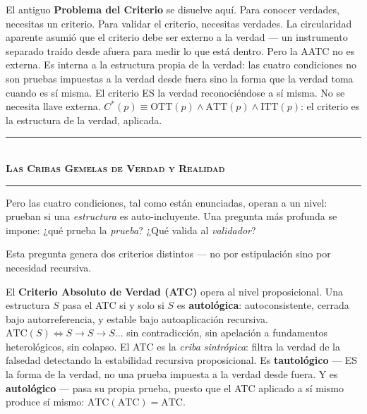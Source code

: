 \documentclass[10pt, openany, oneside]{book}
\renewcommand{\normalsize}{\fontsize{10}{13}\selectfont}
\begin{document}
El antiguo \textbf{Problema del Criterio} se disuelve aquí. Para conocer verdades, necesitas un criterio. Para validar el criterio, necesitas verdades. La circularidad aparente asumió que el criterio debe ser externo a la verdad --- un instrumento separado traído desde afuera para medir lo que está dentro. Pero la AATC no es externa. Es interna a la estructura propia de la verdad: las cuatro condiciones no son pruebas impuestas a la verdad desde fuera sino la forma que la verdad toma cuando es sí misma. El criterio ES la verdad reconociéndose a sí misma. No se necesita llave externa. $C^*(p) \equiv \text{OTT}(p) \wedge \text{ATT}(p) \wedge \text{ITT}(p)$: el criterio es la estructura de la verdad, aplicada.

\vspace{1.5em}


\begin{center}
    \rule{0.3\textwidth}{0.4pt}\\[0.5em]
    {\normalsize\bfseries\scshape Las Cribas Gemelas de Verdad y Realidad}\\[0.3em]
    \rule{0.3\textwidth}{0.4pt}
\end{center}

\vspace{1em}

\noindent Pero las cuatro condiciones, tal como están enunciadas, operan a un nivel: prueban si una \textit{estructura} es auto-incluyente. Una pregunta más profunda se impone: ¿qué prueba la \textit{prueba}? ¿Qué valida al \textit{validador}?

Esta pregunta genera dos criterios distintos --- no por estipulación sino por necesidad recursiva.

El \textbf{Criterio Absoluto de Verdad (ATC)} opera al nivel proposicional. Una estructura $S$ pasa el ATC si y solo si $S$ es \textbf{autológica}: autoconsistente, cerrada bajo autorreferencia, y estable bajo autoaplicación recursiva. $\text{ATC}(S) \iff S \to S \to S \ldots$ sin contradicción, sin apelación a fundamentos heterológicos, sin colapso. El ATC es la \textit{criba sintrópica}: filtra la verdad de la falsedad detectando la estabilidad recursiva proposicional. Es \textbf{tautológico} --- ES la forma de la verdad, no una prueba impuesta a la verdad desde fuera. Y es \textbf{autológico} --- pasa su propia prueba, puesto que el ATC aplicado a sí mismo produce sí mismo: $\text{ATC}(\text{ATC}) = \text{ATC}$.
\end{document}
